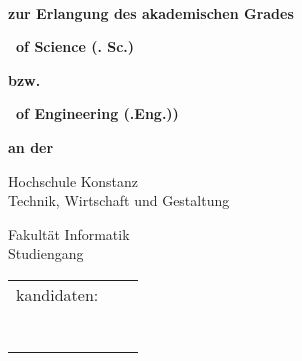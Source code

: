\begin{titlepage}

\AddToShipoutPicture*{\BackgroundImgTitelPage}

\vspace*{\bigskipamount}


{\makeatletter
\fboxsep=0pt
\colorbox{htwg-white}{\begin{minipage}[t]{145mm}
    \begin{flushleft}
        \color{htwg-teal}{\Large \@report@typetext}
        \\
        \color{htwg-teal}\Large \textbf{\@title}
    \end{flushleft}
\end{minipage}}
\makeatother}

\bigskip
\bigskip

{
\setlength{\parskip}{0.5cm}
\begin{center}
	\textbf{zur Erlangung des akademischen Grades}
	
	\textbf{\Large \type\ of Science (\typeshortcut. Sc.)}
	
		\textbf{bzw.}

	\textbf{\Large \type\ of Engineering (\typeshortcut.Eng.))}

	\textbf{an der}
	
	\textsf{\huge Hochschule Konstanz}\\
	{\small Technik, Wirtschaft und Gestaltung}
	
    \textsf{\Large Fakultät Informatik} \\
	Studiengang \studiengangA
	
\end{center}
}

\bigskip
\bigskip
\bigskip

\begin{center}
	\begingroup
	\renewcommand*{\arraystretch}{1}
	{\makeatletter
		\begin{tabular}{lll}
			\type kandidaten: & \verfasserA \\
							& \strasseA \\
							& \wohnortA \\ \\

							& \verfasserB \\
							& \strasseB \\
							& \wohnortB \\ \\ 					
						

\end{tabular}}
\end{center}
\end{titlepage}
